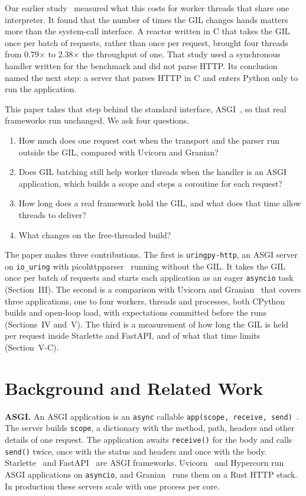 \documentclass[10pt,twocolumn,letterpaper]{article}
\newcommand{\code}[1]{\texttt{#1}}
\newcommand{\kx}{$\times$}
\begin{document}
Our earlier study~\cite{uringpy} measured what this costs for worker threads
that share one interpreter. It found that the number of times the GIL
changes hands matters more than the system-call interface. A reactor written
in C that takes the GIL once per batch of requests, rather than once per
request, brought four threads from 0.79\kx{} to 2.38\kx{} the throughput of
one. That study used a synchronous handler written for the benchmark and did
not parse HTTP. Its conclusion named the next step: a server that parses
HTTP in C and enters Python only to run the application.

This paper takes that step behind the standard interface, ASGI~\cite{asgi},
so that real frameworks run unchanged. We ask four questions.
\begin{enumerate}[label=Q\arabic*.]
\item How much does one request cost when the transport and the parser run
  outside the GIL, compared with Uvicorn and Granian?
\item Does GIL batching still help worker threads when the handler is an
  ASGI application, which builds a scope and steps a coroutine for each
  request?
\item How long does a real framework hold the GIL, and what does that time
  allow threads to deliver?
\item What changes on the free-threaded build?
\end{enumerate}

The paper makes three contributions. The first is \code{uringpy-http}, an
ASGI server on \code{io\_uring} with picohttpparser~\cite{picohttpparser}
running without the GIL. It takes the GIL once per batch of requests and
starts each application as an eager \code{asyncio} task (Section~III). The
second is a comparison with Uvicorn and Granian~\cite{granian} that covers
three applications, one to four workers, threads and processes, both CPython
builds and open-loop load, with expectations committed before the runs
(Sections~IV and~V). The third is a measurement of how long the GIL is held
per request inside Starlette and FastAPI, and of what that time limits
(Section~V-C).

\section{Background and Related Work}

\textbf{ASGI.} An ASGI application is an \code{async} callable
\code{app(scope, receive, send)}~\cite{asgi}. The server builds \code{scope},
a dictionary with the method, path, headers and other details of one
request. The application awaits \code{receive()} for the body and calls
\code{send()} twice, once with the status and headers and once with the
body. Starlette~\cite{starlette} and FastAPI~\cite{fastapi} are ASGI
frameworks. Uvicorn~\cite{uvicorn} and Hypercorn run ASGI applications on
\code{asyncio}, and Granian~\cite{granian} runs them on a Rust HTTP stack. In
production these servers scale with one process per core.
\end{document}

